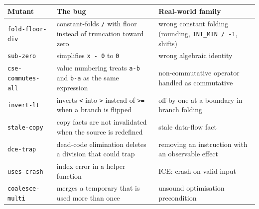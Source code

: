 \documentclass[10pt,a4paper,openany,oneside]{report}
\begin{document}
\begin{center}\small
\begin{xltabular}{\textwidth}{@{}L{3.4cm}L{5.0cm}Y@{}}
\toprule
\textbf{Mutant} & \textbf{The bug} & \textbf{Real-world family}\\
\midrule\endhead
\texttt{fold-floor-div} & constant-folds \texttt{/} with floor instead of truncation toward zero & wrong constant folding (rounding, \texttt{INT\_MIN / -1}, shifts)\\
\texttt{sub-zero} & simplifies \texttt{x - 0} to \texttt{0} & wrong algebraic identity\\
\texttt{cse-commutes-all} & value numbering treats \texttt{a-b} and \texttt{b-a} as the same expression & non-commutative operator handled as commutative\\
\texttt{invert-lt} & inverts \texttt{<} into \texttt{>} instead of \texttt{>=} when a branch is flipped & off-by-one at a boundary in branch folding\\
\texttt{stale-copy} & copy facts are not invalidated when the source is redefined & stale data-flow fact\\
\texttt{dce-trap} & dead-code elimination deletes a division that could trap & removing an instruction with an observable effect\\
\texttt{uses-crash} & index error in a helper function & ICE: crash on valid input\\
\texttt{coalesce-multi} & merges a temporary that is used more than once & unsound optimisation precondition\\
\bottomrule
\end{xltabular}
\end{center}
\end{document}
